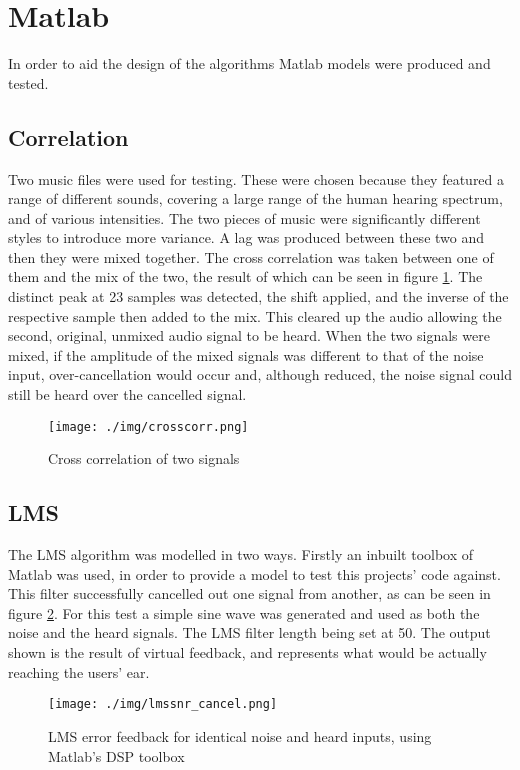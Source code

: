 \section{Matlab}
In order to aid the design of the algorithms Matlab models were produced and
tested.

\subsection{Correlation}

Two music files were used for testing.
These were chosen because they featured a range of different sounds, covering a large range of the human hearing spectrum, and of various intensities.
The two pieces of music were significantly different styles to introduce more variance.
A lag was produced between these two and then they were mixed together.
The cross correlation was taken between one of them and the mix of the two, the result of which can be seen in figure \ref{fig:modelcrosscorr}.
The distinct peak at 23 samples was detected, the shift applied, and the inverse of the respective sample then added to the mix.
This cleared up the audio allowing the second, original, unmixed audio signal to be heard.
When the two signals were mixed, if the amplitude of the mixed signals was different to that of the noise input, over-cancellation would occur and, although reduced, the noise signal could still be heard over the cancelled signal.

\begin{figure}[H]
	\centering
	\texttt{[image: ./img/crosscorr.png]}
	\caption{Cross correlation of two signals}
	\label{fig:modelcrosscorr}
\end{figure}

\subsection{LMS}
The LMS algorithm was modelled in two ways.
Firstly an inbuilt toolbox of Matlab was used, in order to provide a model to test this projects' code against.
This filter successfully cancelled out one signal from another, as can be seen in figure \ref{fig:modellmscancel}.
For this test a simple sine wave was generated and used as both the noise and the heard signals.
The LMS filter length being set at 50.
The output shown is the result of virtual feedback, and represents what would be actually reaching the users' ear.

\begin{figure}[H]
	\centering
	\texttt{[image: ./img/lmssnr\_cancel.png]}
	\caption{LMS error feedback for identical noise and heard inputs, using Matlab's DSP toolbox}
	\label{fig:modellmscancel}
\end{figure}

